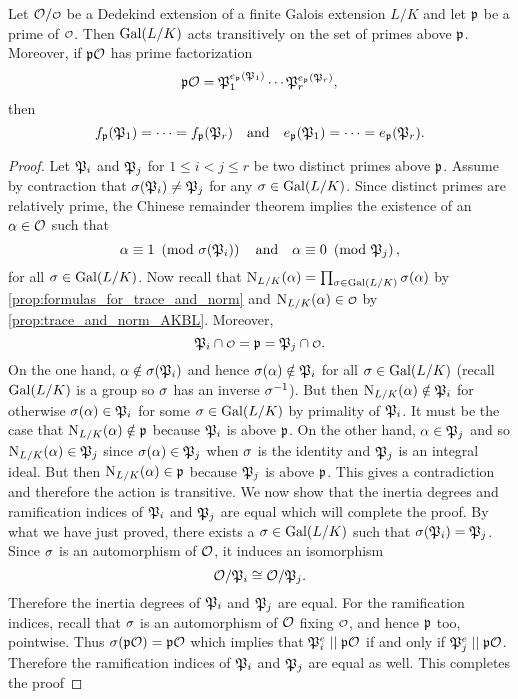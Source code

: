     \begin{proposition}\label{prop:Galois_action_on_primes_is_transitive}
      Let $\mc{O}/\smc{O}$ be a Dedekind extension of a finite Galois extension $L/K$ and let $\mathfrak{p}$ be a prime of $\smc{O}$. Then $\operatorname{\mathrm{Gal}}(L/K)$ acts transitively on the set of primes above $\mathfrak{p}$. Moreover, if $\mathfrak{p}\mathcal{O}$ has prime factorization
      \[
        \mathfrak{p}\mathcal{O} = \mathfrak{P}_{1}^{e_{\mathfrak{p}}(\mathfrak{P}_{1})} \cdots \mathfrak{P}_{r}^{e_{\mathfrak{p}}(\mathfrak{P}_{r})},
      \]
      then
      \[
        f_{\mathfrak{p}}(\mathfrak{P}_{1}) = \cdots = f_{\mathfrak{p}}(\mathfrak{P}_{r}) \quad \text{and} \quad e_{\mathfrak{p}}(\mathfrak{P}_{1}) = \cdots = e_{\mathfrak{p}}(\mathfrak{P}_{r}).
      \]
    \end{proposition}
    \begin{proof}
      Let $\mathfrak{P}_{i}$ and $\mathfrak{P}_{j}$ for $1 \le i < j \le r$ be two distinct primes above $\mathfrak{p}$. Assume by contraction that $\sigma(\mathfrak{P}_{i}) \neq \mathfrak{P}_{j}$ for any $\sigma \in \operatorname{\mathrm{Gal}}(L/K)$. Since distinct primes are relatively prime, the Chinese remainder theorem implies the existence of an $\alpha \in \mathcal{O}$ such that
      \[
        \alpha \equiv 1 \ \left(\text{mod }\sigma(\mathfrak{P}_{i})\right) \quad \text{and} \quad \alpha \equiv 0 \ \left(\text{mod }\mathfrak{P}_{j}\right),
      \]
      for all $\sigma \in \operatorname{\mathrm{Gal}}(L/K)$. Now recall that $\operatorname{\mathrm{N}}_{L/K}(\alpha) = \prod_{\sigma \in \operatorname{\mathrm{Gal}}(L/K)}\sigma(\alpha)$ by \cref{prop:formulas_for_trace_and_norm} and $\Norm_{L/K}(\a) \in \smc{O}$ by \cref{prop:trace_and_norm_AKBL}. Moreover,
      \[
        \mf{P}_{i} \cap \smc{O} = \mf{p} = \mf{P}_{j} \cap \smc{O}.
      \]
      On the one hand, $\alpha \notin \sigma(\mathfrak{P}_{i})$ and hence $\sigma(\alpha) \notin \mathfrak{P}_{i}$ for all $\sigma \in \operatorname{\mathrm{Gal}}(L/K)$ (recall $\operatorname{\mathrm{Gal}}(L/K)$ is a group so $\sigma$ has an inverse $\sigma^{-1}$). But then $\operatorname{\mathrm{N}}_{L/K}(\alpha) \notin \mathfrak{P}_{i}$ for otherwise $\sigma(\alpha) \in \mathfrak{P}_{i}$ for some $\sigma \in \operatorname{\mathrm{Gal}}(L/K)$ by primality of $\mathfrak{P}_{i}$. It must be the case that $\operatorname{\mathrm{N}}_{L/K}(\alpha) \notin \mathfrak{p}$ because $\mathfrak{P}_{i}$ is above $\mathfrak{p}$. On the other hand, $\alpha \in \mathfrak{P}_{j}$ and so $\operatorname{\mathrm{N}}_{L/K}(\alpha) \in \mathfrak{P}_{j}$ since $\sigma(\alpha) \in \mathfrak{P}_{j}$ when $\sigma$ is the identity and $\mathfrak{P}_{j}$ is an integral ideal. But then $\operatorname{\mathrm{N}}_{L/K}(\alpha) \in \mathfrak{p}$ because $\mathfrak{P}_{j}$ is above $\mathfrak{p}$. This gives a contradiction and therefore the action is transitive. We now show that the inertia degrees and ramification indices of $\mathfrak{P}_{i}$ and $\mathfrak{P}_{j}$ are equal which will complete the proof. By what we have just proved, there exists a $\sigma \in \operatorname{\mathrm{Gal}}(L/K)$ such that $\sigma(\mathfrak{P}_{i}) = \mathfrak{P}_{j}$. Since $\sigma$ is an automorphism of $\mathcal{O}$, it induces an isomorphism
      \[
        \mathcal{O}/\mathfrak{P}_{i} \cong \mathcal{O}/\mathfrak{P}_{j}.
      \]
      Therefore the inertia degrees of $\mathfrak{P}_{i}$ and $\mathfrak{P}_{j}$ are equal. For the ramification indices, recall that $\sigma$ is an automorphism of $\mathcal{O}$ fixing $\smc{O}$, and hence $\mathfrak{p}$ too, pointwise. Thus $\sigma(\mathfrak{p}\mathcal{O}) = \mathfrak{p}\mathcal{O}$ which implies that $\mathfrak{P}_{i}^{e} \mid\mid \mathfrak{p}\mathcal{O}$ if and only if $\mathfrak{P}_{j}^{e} \mid\mid \mathfrak{p}\mathcal{O}$. Therefore the ramification indices of $\mathfrak{P}_{i}$ and $\mathfrak{P}_{j}$ are equal as well. This completes the proof 
    \end{proof}

